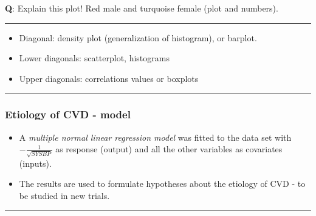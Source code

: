 \documentclass[]{article}
\newenvironment{Shaded}{\begin{snugshade}}{\end{snugshade}}
\newcommand{\DataTypeTok}[1]{\textcolor[rgb]{0.13,0.29,0.53}{#1}}
\newcommand{\DecValTok}[1]{\textcolor[rgb]{0.00,0.00,0.81}{#1}}
\newcommand{\KeywordTok}[1]{\textcolor[rgb]{0.13,0.29,0.53}{\textbf{#1}}}
\newcommand{\NormalTok}[1]{#1}
\newcommand{\OperatorTok}[1]{\textcolor[rgb]{0.81,0.36,0.00}{\textbf{#1}}}
\newcommand{\StringTok}[1]{\textcolor[rgb]{0.31,0.60,0.02}{#1}}
\providecommand{\tightlist}{%
  \setlength{\itemsep}{0pt}\setlength{\parskip}{0pt}}
\begin{document}
\textbf{Q}: Explain this plot! Red male and turquoise female (plot and
numbers).

\begin{center}\rule{0.5\linewidth}{\linethickness}\end{center}

\begin{itemize}
\tightlist
\item
  Diagonal: density plot (generalization of histogram), or barplot.
\item
  Lower diagonals: scatterplot, histograms
\item
  Upper diagonals: correlations values or boxplots
\end{itemize}

\begin{center}\rule{0.5\linewidth}{\linethickness}\end{center}

\hypertarget{etiology-of-cvd---model}{%
\subsubsection{Etiology of CVD - model}\label{etiology-of-cvd---model}}

\begin{itemize}
\tightlist
\item
  A \emph{multiple normal linear regression model} was fitted to the
  data set with \(-\frac{1}{\sqrt{SYSBP}}\) as response (output) and all
  the other variables as covariates (inputs).
\item
  The results are used to formulate hypotheses about the etiology of CVD
  - to be studied in new trials.
\end{itemize}

\begin{center}\rule{0.5\linewidth}{\linethickness}\end{center}

\footnotesize

\begin{Shaded}
\end{Shaded}
\end{document}
